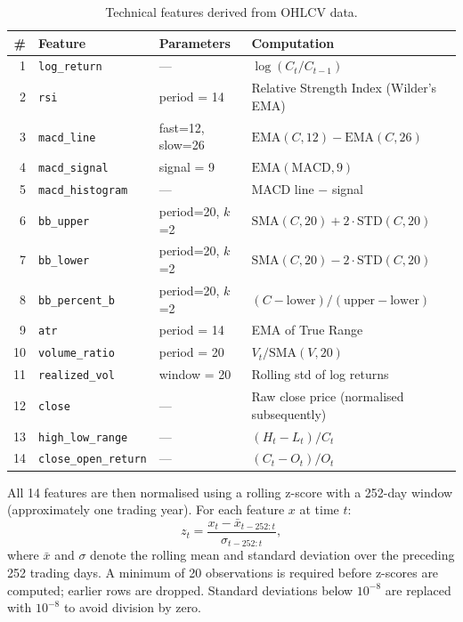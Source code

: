 \begin{table}[h]
\centering
\caption{Technical features derived from OHLCV data.}
\label{tab:features}
\begin{tabular}{@{}rllp{5cm}@{}}
\toprule
\textbf{\#} & \textbf{Feature} & \textbf{Parameters} & \textbf{Computation} \\
\midrule
1  & \texttt{log\_return}       & ---               & $\log(C_t / C_{t-1})$ \\
2  & \texttt{rsi}               & period = 14       & Relative Strength Index (Wilder's EMA) \\
3  & \texttt{macd\_line}        & fast=12, slow=26  & $\text{EMA}(C, 12) - \text{EMA}(C, 26)$ \\
4  & \texttt{macd\_signal}      & signal = 9        & $\text{EMA}(\text{MACD}, 9)$ \\
5  & \texttt{macd\_histogram}   & ---               & MACD line $-$ signal \\
6  & \texttt{bb\_upper}         & period=20, $k$=2  & $\text{SMA}(C, 20) + 2 \cdot \text{STD}(C, 20)$ \\
7  & \texttt{bb\_lower}         & period=20, $k$=2  & $\text{SMA}(C, 20) - 2 \cdot \text{STD}(C, 20)$ \\
8  & \texttt{bb\_percent\_b}    & period=20, $k$=2  & $(C - \text{lower}) / (\text{upper} - \text{lower})$ \\
9  & \texttt{atr}               & period = 14       & EMA of True Range \\
10 & \texttt{volume\_ratio}     & period = 20       & $V_t / \text{SMA}(V, 20)$ \\
11 & \texttt{realized\_vol}     & window = 20       & Rolling std of log returns \\
12 & \texttt{close}             & ---               & Raw close price (normalised subsequently) \\
13 & \texttt{high\_low\_range}  & ---               & $(H_t - L_t) / C_t$ \\
14 & \texttt{close\_open\_return} & ---             & $(C_t - O_t) / O_t$ \\
\bottomrule
\end{tabular}
\end{table}

All 14 features are then normalised using a rolling z-score with a 252-day
window (approximately one trading year). For each feature $x$ at time $t$:
\begin{equation}
z_t = \frac{x_t - \bar{x}_{t-252:t}}{\sigma_{t-252:t}},
\end{equation}
where $\bar{x}$ and $\sigma$ denote the rolling mean and standard deviation
over the preceding 252 trading days. A minimum of 20 observations is required
before z-scores are computed; earlier rows are dropped. Standard deviations
below $10^{-8}$ are replaced with $10^{-8}$ to avoid division by zero.

